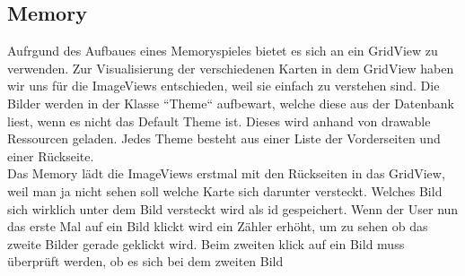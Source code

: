 \documentclass[11pt,a4paper]{article}
\begin{document}
\subsection{Memory}
Aufrgund des Aufbaues eines Memoryspieles bietet es sich an ein GridView zu verwenden. Zur Visualisierung der verschiedenen Karten in dem GridView haben wir uns für die ImageViews entschieden, weil sie einfach zu verstehen sind. 
Die Bilder werden in der Klasse ``Theme`` aufbewart, welche diese aus der Datenbank liest, wenn es nicht das Default Theme ist. Dieses wird anhand von drawable Ressourcen geladen. Jedes Theme besteht aus einer Liste der Vorderseiten und einer Rückseite. \\
Das Memory lädt die ImageViews erstmal mit den Rückseiten in das GridView, weil man ja nicht sehen soll welche Karte sich darunter versteckt. Welches Bild sich wirklich unter dem Bild versteckt wird als id gespeichert. Wenn der User nun das erste Mal auf ein Bild klickt wird ein Zähler erhöht, um zu sehen ob das zweite Bilder gerade geklickt wird. Beim zweiten klick auf ein Bild  muss überprüft werden, ob es sich bei dem zweiten Bild
\end{document}
